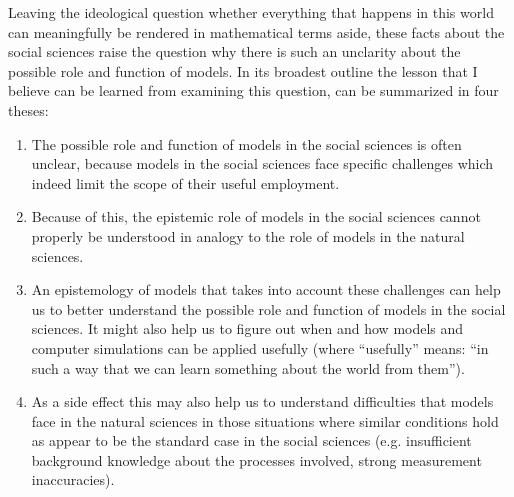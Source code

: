 \documentclass[onecollarge]{STJour}
\numberwithin{equation}{section}
\begin{document}
Leaving the ideological question whether everything that happens in this
world can meaningfully be rendered in mathematical terms aside, these
facts about the social sciences raise the question why there is such an
unclarity about the possible role and function of models. In its
broadest outline the lesson that I believe can be learned from examining
this question, can be summarized in four theses:

\begin{enumerate}
  \item The possible role and function of models in the social sciences
  is often unclear, because models in the social sciences face specific
  challenges which indeed limit the scope of their useful
  employment.
  \item Because of this, the epistemic role of models in the social
  sciences cannot properly be understood in analogy to the role of
  models in the natural sciences.
  \item An epistemology of models that takes into account these
  challenges can help us to better understand the possible
  role and function of models in the social sciences. It might also
  help us to figure out when and how models and computer simulations
  can be applied usefully (where ``usefully'' means: ``in such a way
  that we can learn something about the world from them'').
  \item As a side effect this may also help us to understand
  difficulties that models face in the natural sciences in those
  situations where similar conditions hold as appear to be the standard case in
  the social sciences (e.g. insufficient background knowledge about the processes
  involved, strong measurement inaccuracies).
\end{enumerate}
\end{document}
